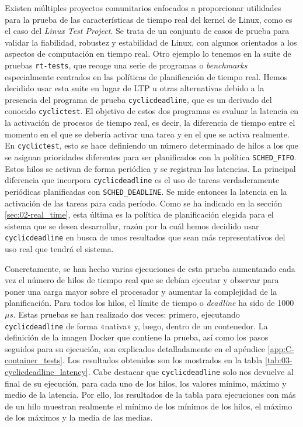Existen múltiples proyectos comunitarios enfocados a proporcionar utilidades
para la prueba de las características de tiempo real del kernel de Linux, como
es el caso del \textit{Linux Test Project}. Se trata de un conjunto de casos de
prueba para validar la fiabilidad, robustez y estabilidad de Linux, con algunos
orientados a los aspectos de computación en tiempo real. Otro ejemplo lo tenemos
en la suite de pruebas \texttt{rt-tests}, que recoge una serie de programas o
\textit{benchmarks} especialmente centrados en las políticas de planificación de
tiempo real. Hemos decidido usar esta suite en lugar de LTP u otras alternativas
debido a la presencia del programa de prueba \texttt{cyclicdeadline}, que es un
derivado del conocido \texttt{cyclictest}. El objetivo de estos dos programas es
evaluar la latencia en la activación de procesos de tiempo real, es decir, la
diferencia de tiempo entre el momento en el que se debería activar una tarea y
en el que se activa realmente. En \texttt{cyclictest}, esto se hace definiendo
un número determinado de hilos a los que se asignan prioridades diferentes para
ser planificados con la política \texttt{SCHED\_FIFO}. Estos hilos se activan de
forma periódica y se registran las latencias. La principal diferencia que
incorpora \texttt{cyclicdeadline} es el uso de tareas verdaderamente periódicas
planificadas con \texttt{SCHED\_DEADLINE}. Se mide entonces la latencia en la
activación de las tareas para cada período. Como se ha indicado en la sección
\ref{sec:02-real_time}, esta última es la política de planificación elegida para
el sistema que se desea desarrollar, razón por la cuál hemos decidido usar
\texttt{cyclicdeadline} en busca de unos resultados que sean más representativos
del uso real que tendrá el sistema.

Concretamente, se han hecho varias ejecuciones de esta prueba aumentando cada
vez el número de hilos de tiempo real que se debían ejecutar y observar para
poner una carga mayor sobre el procesador y aumentar la complejidad de la
planificación. Para todos los hilos, el límite de tiempo o \textit{deadline} ha
sido de 1000$\mu s$. Estas pruebas se han realizado dos veces: primero,
ejecutando \texttt{cyclicdeadline} de forma «nativa» y, luego, dentro de un
contenedor. La definición de la imagen Docker que contiene la prueba, así como
los pasos seguidos para su ejecución, son explicados detalladamente en el
apéndice \ref{app:C-container_tests}. Los resultados obtenidos son los mostrados
en la tabla \ref{tab:03-cyclicdeadline_latency}. Cabe destacar que
\texttt{cyclicdeadline} solo nos devuelve al final de su ejecución, para cada
uno de los hilos, los valores mínimo, máximo y medio de la latencia. Por ello,
los resultados de la tabla para ejecuciones con más de un hilo muestran
realmente el mínimo de los mínimos de los hilos, el máximo de los máximos y la
media de las medias.


